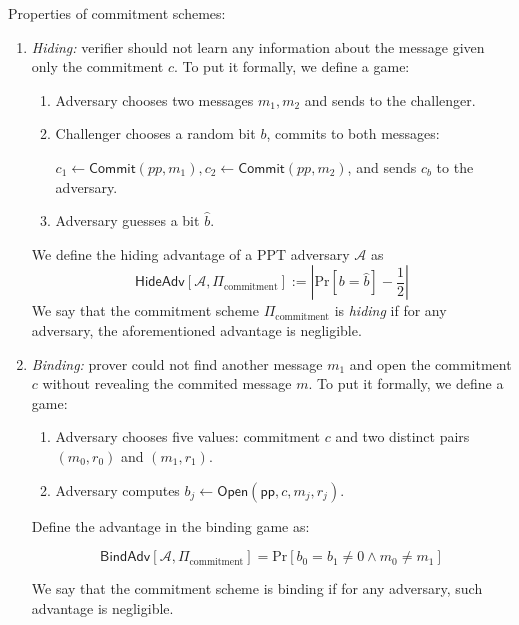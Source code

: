 \documentclass[../lecture-notes-148x210.tex]{subfiles}
\begin{document}
\begin{definition}
    Properties of commitment schemes:
    \begin{enumerate}
        \item \textit{Hiding: } verifier should not learn any information about the message given only the commitment $c$. To put it formally, we define a game:
        \begin{enumerate}
            \item Adversary chooses two messages $m_1,m_2$ and sends to the challenger.
            \item Challenger chooses a random bit $b$, commits to both messages: 
            
                $c_1 \gets \mathsf{Commit}(pp, m_1), c_2 \gets \mathsf{Commit}(pp,m_2)$, 
                    and sends $c_b$ to the adversary.
            \item Adversary guesses a bit $\hat{b}$.
        \end{enumerate}
        
        We define the hiding advantage of a PPT adversary $\mathcal{A}$ as 
        \begin{equation*}
            \mathsf{HideAdv}[\mathcal{A}, \Pi_{\text{commitment}}] := \left| \text{Pr}[b=\hat{b}] - \frac{1}{2} \right|
        \end{equation*}
        We say that the commitment scheme $\Pi_{\text{commitment}}$ is \textit{hiding} if for any adversary, the aforementioned advantage is negligible.
        
        \item \textit{Binding: } prover could not find another message $m_1$ and open the commitment $c$ without revealing the commited message $m$.
        To put it formally, we define a game:
        
        \begin{enumerate}
            \item Adversary chooses five values: commitment $c$ and two distinct pairs $(m_0,r_0)$ and $(m_1,r_1)$.
            \item Adversary computes $b_j \gets \mathsf{Open}(\mathsf{pp}, c, m_j, r_j)$. 
        \end{enumerate}
        
        Define the advantage in the binding game as:
        
        \begin{equation*}
            \mathsf{BindAdv}[\mathcal{A}, \Pi_{\text{commitment}}] = \text{Pr}[b_0 = b_1 \neq 0 \wedge m_0 \neq m_1]
        \end{equation*}

        We say that the commitment scheme is binding if for any adversary, such advantage is negligible.

    \end{enumerate}
\end{definition}
\end{document}
